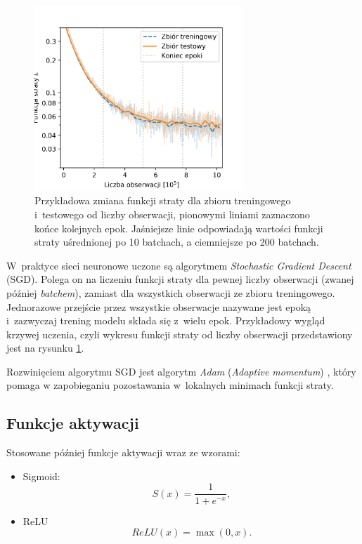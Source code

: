 \documentclass{pracalicmgr}
\begin{document}
	\begin{figure}
	\centering
	\includegraphics[width=0.7\textwidth]{loss_ensemble.png}
	\caption{Przykładowa zmiana funkcji straty dla zbioru treningowego i~testowego od liczby obserwacji, pionowymi liniami zaznaczono końce kolejnych epok. Jaśniejsze linie odpowiadają wartości funkcji straty uśrednionej po 10 batchach, a ciemniejsze po 200 batchach.}
	\label{fig:loss_example}
	\end{figure}	
	
	W~praktyce sieci neuronowe uczone są algorytmem \textit{Stochastic Gradient Descent} (SGD). Polega on na liczeniu funkcji straty dla pewnej liczby obserwacji (zwanej później \textit{batchem}), zamiast dla wszystkich obserwacji ze zbioru treningowego. Jednorazowe przejście przez wszystkie obserwacje nazywane jest epoką i~zazwyczaj trening modelu składa się z~wielu epok. Przykładowy wygląd krzywej uczenia, czyli wykresu funkcji straty od liczby obserwacji przedstawiony jest na rysunku \ref{fig:loss_example}.
	
	Rozwinięciem algorytmu SGD jest algorytm \textit{Adam} (\textit{Adaptive momentum}) \cite{adam}, który pomaga w zapobieganiu pozostawania w~lokalnych minimach funkcji straty.
	\newpage
	\subsection{Funkcje aktywacji}
	Stosowane później funkcje aktywacji wraz ze wzorami:
	\begin{itemize}
	\item Sigmoid: $$S(x) = \frac{1}{1+e^{-x}},$$
	\item ReLU\cite{relu} $$ReLU(x) = \max(0, x).$$
	\end{itemize}
	
\end{document}
